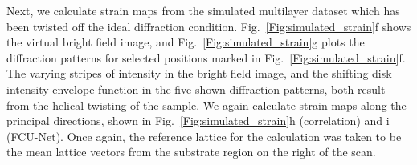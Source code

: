 \documentclass[%
 reprint,
superscriptaddress,
 amsmath,
 amssymb,
 prl,
]{revtex4-2}
\begin{document}

Next, we calculate strain maps from the simulated multilayer dataset which has been twisted off the ideal diffraction condition. Fig.~\ref{Fig:simulated_strain}f shows the virtual bright field image, and Fig.~\ref{Fig:simulated_strain}g plots the diffraction patterns for selected positions marked in Fig.~\ref{Fig:simulated_strain}f.  The varying stripes of intensity in the bright field image, and the shifting disk intensity envelope function in the five shown diffraction patterns, both result from the helical twisting of the sample.  We again calculate strain maps along the principal directions, shown in Fig.~\ref{Fig:simulated_strain}h (correlation) and i (FCU-Net). Once again, the reference lattice for the calculation was taken to be the mean lattice vectors from the substrate region on the right of the scan.
\end{document}
